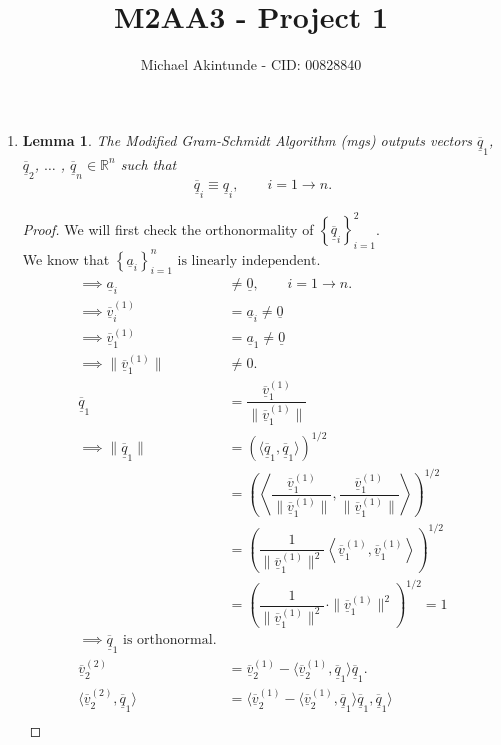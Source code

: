 \documentclass{article}
\newcommand{\mgs}[1] {\underline{\overline{#1}}}
\newcommand{\cgs}[1] {\underline{#1}}
\newcommand{\mgzz}[2] {\ensuremath{\underline{\overline{#1}}}_{#2}}
\newtheorem{theorem}{Lemma}
\begin{document}
\title{M2AA3 - Project 1}
\author{Michael Akintunde - CID: 00828840}

\maketitle

\begin{enumerate}
  \item 
  \begin{theorem}
  The Modified Gram-Schmidt Algorithm (mgs) outputs vectors $\mgs{q}_1$, $\mgs{q}_2$, $\ldots$ , $\mgs{q}_n \in \mathbb{R}^n$ such that $$\mgs{q}_i \equiv \cgs{q}_i, \qquad i = 1 \rightarrow n.$$
  \end{theorem}
  \begin{proof}
  We will first check the orthonormality of $\left\{ \mgzz{q}{i} \right\}_{i=1}^2$.\\
  We know that $\left\{ \cgs{a}_i \right\}_{i=1}^n \text{ is linearly independent.}$
  \begin{align*}
    \implies \cgs{a}_i &\neq \underline{0} , \qquad i = 1 \rightarrow n. \\
    \implies \mgs{v}_i^{(1)} &= \cgs{a}_i \neq \underline{0} \\
    \implies \mgs{v}_1^{(1)} &= \cgs{a}_1 \neq \underline{0} \\
    \implies \|\mgs{v}_1^{(1)}\| &\neq 0. \\
    \mgs{q}_1 &= \dfrac{\mgs{v}_1^{(1)}}{\|\mgs{v}_1^{(1)}\|} \\
    \implies \|\mgs{q}_1\| &= \left( \langle \mgs{q}_1 , \mgs{q}_1 \rangle \right)^{1/2}  \\
    &= \left( \left\langle \dfrac{\mgs{v}_1^{(1)}}{\|\mgs{v}_1^{(1)}\|} , \dfrac{\mgs{v}_1^{(1)}}{\|\mgs{v}_1^{(1)}\|} \right\rangle \right)^{1/2} \\
    &= \left( \dfrac{1}{\|\mgs{v}_1^{(1)}\|^2} \left\langle \mgs{v}_1^{(1)} , \mgs{v}_1^{(1)} \right\rangle \right)^{1/2} \\
    &= \left( \dfrac{1}{\|\mgs{v}_1^{(1)}\|^2} \cdot  \|\mgs{v}_1^{(1)}\|^2 \right)^{1/2} = 1 \\
    \implies \mgs{q}_1 \text{ is orthonormal}.\\
    \mgs{v}_2^{(2)} &= \mgs{v}_2^{(1)} - \langle \mgs{v}_2^{(1)}, \mgs{q}_1 \rangle \mgs{q}_1. \\
    \langle \mgs{v}_2^{(2)}, \mgs{q}_1 \rangle 
    &= \langle \mgs{v}_2^{(1)} - \langle \mgs{v}_2^{(1)}, \mgs{q}_1 \rangle \mgs{q}_1, \mgs{q}_1 \rangle \\

\end{align*}
\end{proof}
\end{enumerate}
\end{document}
